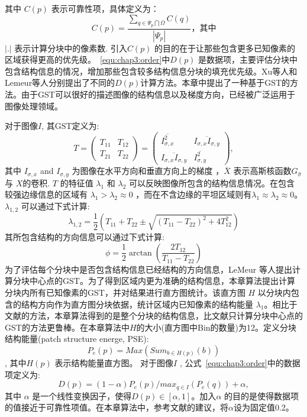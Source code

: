 其中 \(C(p)\) 表示可靠性项\cite{Criminisi04regionfilling}，具体定义为： $$C(p)=\frac{\sum_{q\in\Psi_p\bigcap\overline{\Omega}}{C(q)}}{\left\vert{\Psi_p}\right\vert}，其中$$\(\left\vert.\right\vert\)  表示计算分块中的像素数. 引入\(C(p)\) 的目的在于让那些包含更多已知像素的区域获得更高的优先级。~\ref{equ:chap3:order}中\(D(p)\) 是数据项，主要评估分块中包含结构信息的情况，增加那些包含较多结构信息分块的填充优先级。Xu等人\cite{Xu:2010}和Lemeur等人\cite{LeMeur_2011}分别提出了不同的\(D(p)\)计算方法。本章中提出了一种基于GST的方法。由于GST可以很好的描述图像的结构信息以及梯度方向，已经被广泛运用于图像处理领域\cite{Kothe03edgeand}。 \par
 对于图像\(I\), 其GST定义为:
 $$T=\left(\begin{array}{cc}T_{11} & T_{12} \\ T_{21} &T_{22}\end{array}\right)=\left(\begin{array}{cc}\overline{I_{\sigma,x}^2} & \overline{I_{\sigma,x}I_{\sigma,y}} \\ \overline{I_{\sigma,x}I_{\sigma,y}} & \overline{I_{\sigma,y}^2}\end{array}\right),$$
 其中 \(I_{\sigma,x}\) and \(I_{\sigma,y}\)  为图像在水平方向和垂直方向上的梯度 ，\(\overline{X}\) 表示高斯核函数\(G_{\hat{\sigma}}\) 与 \(X\)的卷积. \(T\) 的特征值 \(\lambda_1\) 和 \(\lambda_2\) 可以反映图像所包含的结构信息情况。在包含较强边缘信息的区域有 \(\lambda_1>\lambda_2\approx0\) ，而在不含边缘的平坦区域则有\(\lambda_1\approx\lambda_2\approx0\)。 \( \lambda_{1,2} \) 可以通过下式计算: $$\lambda_{1,2}=\frac{1}{2}\left(T_{11}+T_{22}\pm\sqrt{\left(T_{11}-T_{22}\right)^2+4T^2_{12}}\right)$$
 其所包含结构的方向信息可以通过下式计算:
$$\phi=\frac{1}{2}\arctan{\left(\frac{2T_{12}}{T_{11}-T_{22}}\right)}$$
为了评估每个分块中是否包含结构信息已经结构的方向信息，LeMeur
等人\cite{LeMeur_2011}提出计算分块中心点的GST。为了得到区域内更为准确的结构信息，本章算法提出计算分块内所有已知像素的GST，并对结果进行直方图统计。该直方图 \(H\) 以分块内包含的结构方向作为直方图分块依据，统计区域内已知像素的结构能量 \(\lambda_1\)。相比于文献\cite{LeMeur_2011}的方法，本章算法得到的是整个分块的结构信息，比文献\cite{LeMeur_2011}只计算分块中心点的GST的方法更鲁棒。在本章算法中\(H\)的大小(直方图中Bin的数量)为12。定义分块结构能量(patch structure energe, PSE):
$$P_e\left(p\right)=Max\left(Sum_{b\in{H\left(p\right)}}\left(b\right)\right)$$, 其中\(H\left(p\right)\) 表示结构能量直方图。 对于图像\(I\) , 公式~\ref{equ:chap3:order}中的数据项定义为:
$$D(p)=(1-\alpha)P_e(p)/max_{q\in{I}}(P_e(q))+\alpha,$$ 其中 \(\alpha\) 是一个线性变换因子，使得\(D(p)\in{[\alpha,1]}\)。加入\(\alpha\) 的目的是使得数据项的值接近于可靠性项值。在本章算法中，参考文献\cite{Xu:2010}的建议，将\(\alpha\)设为固定值0.2。
